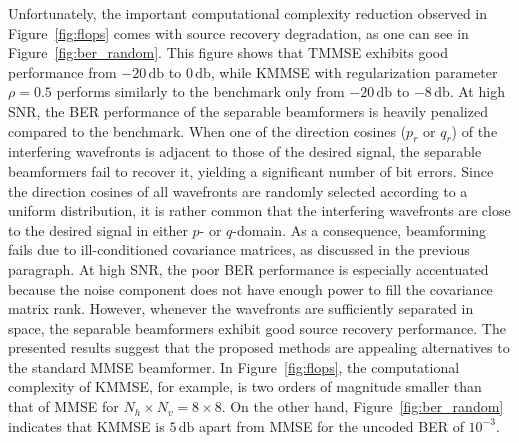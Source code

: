 \documentclass{cta-author}
\begin{document}
Unfortunately, the important computational complexity reduction observed in Figure~\ref{fig:flops} comes with source recovery degradation, as one can see in Figure~\ref{fig:ber_random}. This figure shows that TMMSE exhibits good performance from $-20\,\si{\decibel}$ to $0\,\si{\decibel}$, while KMMSE with regularization parameter $\rho=0.5$ performs similarly to the benchmark only from $-20\,\si{\decibel}$ to $-8\,\si{\decibel}$. At high SNR, the BER performance of the separable beamformers is heavily penalized compared to the benchmark. When one of the direction cosines ($p_r$ or $q_r$) of the interfering wavefronts is adjacent to those of the desired signal, the separable beamformers fail to recover it, yielding a significant number of bit errors. Since the direction cosines of all wavefronts are randomly selected according to a uniform distribution, it is rather common that the interfering wavefronts are close to the desired signal in either $p$- or $q$-domain. As a consequence, beamforming fails due to ill-conditioned covariance matrices, as discussed in the previous paragraph. At high SNR, the poor BER performance is especially accentuated because the noise component does not have enough power to fill the covariance matrix rank. However, whenever the wavefronts are sufficiently separated in space, the separable beamformers exhibit good source recovery performance. The presented results suggest that the proposed methods are appealing alternatives to the standard MMSE beamformer. In Figure~\ref{fig:flops}, the computational complexity of KMMSE, for example, is two orders of magnitude smaller than that of MMSE for $N_h \times N_v = 8\times 8$. On the other hand, Figure~\ref{fig:ber_random} indicates that KMMSE is $5\,\si{\decibel}$ apart from MMSE for the uncoded BER of $10^{-3}$.
\end{document}
